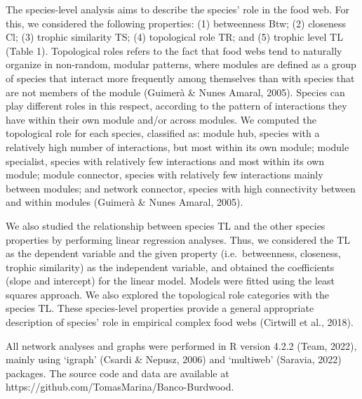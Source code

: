 \documentclass[preprint, 3p,
authoryear]{elsarticle} %
\begin{document}
The species-level analysis aims to describe the species' role in the
food web. For this, we considered the following properties: (1)
betweenness Btw; (2) closeness Cl; (3) trophic similarity TS; (4)
topological role TR; and (5) trophic level TL (Table 1). Topological
roles refers to the fact that food webs tend to naturally organize in
non-random, modular patterns, where modules are defined as a group of
species that interact more frequently among themselves than with species
that are not members of the module (Guimerà \& Nunes Amaral, 2005).
Species can play different roles in this respect, according to the
pattern of interactions they have within their own module and/or across
modules. We computed the topological role for each species, classified
as: module hub, species with a relatively high number of interactions,
but most within its own module; module specialist, species with
relatively few interactions and most within its own module; module
connector, species with relatively few interactions mainly between
modules; and network connector, species with high connectivity between
and within modules (Guimerà \& Nunes Amaral, 2005).

We also studied the relationship between species TL and the other
species properties by performing linear regression analyses. Thus, we
considered the TL as the dependent variable and the given property
(i.e.~betweenness, closeness, trophic similarity) as the independent
variable, and obtained the coefficients (slope and intercept) for the
linear model. Models were fitted using the least squares approach. We
also explored the topological role categories with the species TL. These
species-level properties provide a general appropriate description of
species' role in empirical complex food webs (Cirtwill et al., 2018).

All network analyses and graphs were performed in R version 4.2.2 (Team,
2022), mainly using `igraph' (Csardi \& Nepusz, 2006) and `multiweb'
(Saravia, 2022) packages. The source code and data are available at
https://github.com/TomasMarina/Banco-Burdwood.
\end{document}
